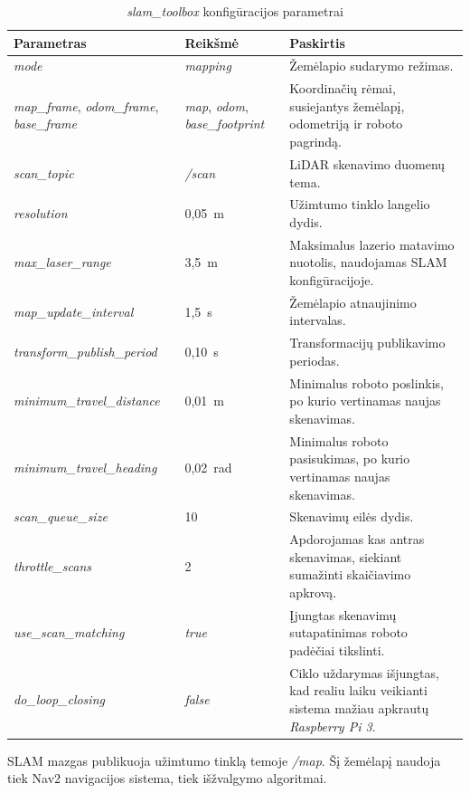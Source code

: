 \documentclass[]{VUMIFTemplateClass}
\begin{document}
\begin{table}[H]
\centering
\caption{\textit{slam\_toolbox} konfigūracijos parametrai}
\label{tab:slam-params}
\small
\begin{tabular}{|p{}|p{}|p{}|}
\hline
\textbf{Parametras} & \textbf{Reikšmė} & \textbf{Paskirtis} \\
\hline
\textit{mode} & \textit{mapping} & Žemėlapio sudarymo režimas. \\
\hline
\textit{map\_frame}, \textit{odom\_frame}, \textit{base\_frame} & \textit{map}, \textit{odom}, \textit{base\_footprint} & Koordinačių rėmai, susiejantys žemėlapį, odometriją ir roboto pagrindą. \\
\hline
\textit{scan\_topic} & \textit{/scan} & LiDAR skenavimo duomenų tema. \\
\hline
\textit{resolution} & 0,05~m & Užimtumo tinklo langelio dydis. \\
\hline
\textit{max\_laser\_range} & 3,5~m & Maksimalus lazerio matavimo nuotolis, naudojamas SLAM konfigūracijoje. \\
\hline
\textit{map\_update\_interval} & 1,5~s & Žemėlapio atnaujinimo intervalas. \\
\hline
\textit{transform\_publish\_period} & 0,10~s & Transformacijų publikavimo periodas. \\
\hline
\textit{minimum\_travel\_distance} & 0,01~m & Minimalus roboto poslinkis, po kurio vertinamas naujas skenavimas. \\
\hline
\textit{minimum\_travel\_heading} & 0,02~rad & Minimalus roboto pasisukimas, po kurio vertinamas naujas skenavimas. \\
\hline
\textit{scan\_queue\_size} & 10 & Skenavimų eilės dydis. \\
\hline
\textit{throttle\_scans} & 2 & Apdorojamas kas antras skenavimas, siekiant sumažinti skaičiavimo apkrovą. \\
\hline
\textit{use\_scan\_matching} & \textit{true} & Įjungtas skenavimų sutapatinimas roboto padėčiai tikslinti. \\
\hline
\textit{do\_loop\_closing} & \textit{false} & Ciklo uždarymas išjungtas, kad realiu laiku veikianti sistema mažiau apkrautų \textit{Raspberry Pi 3}. \\
\hline
\end{tabular}
\end{table}

SLAM mazgas publikuoja užimtumo tinklą temoje \textit{/map}. Šį žemėlapį naudoja tiek Nav2 navigacijos sistema, tiek išžvalgymo algoritmai.
\end{document}
